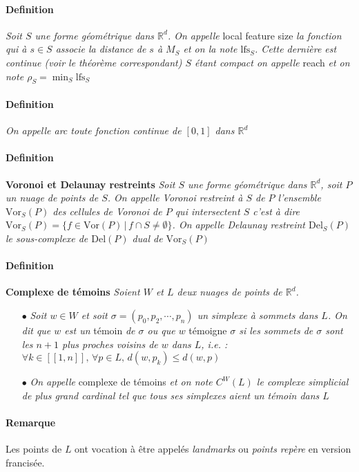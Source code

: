 \documentclass{report}
\newcommand{\R}{\mathbb{R}}
\newcommand{\Vor}{\mathrm{Vor}}
\newcommand{\Del}{\mathrm{Del}}
\begin{document}
\paragraph{Definition} \textit{Soit $S$ une forme géométrique dans $\R^d$. On appelle} local feature size \textit{la fonction qui à $s\in S$ associe la distance de $s$ à $M_S$ et on la note $\mathrm{lfs}_S$. Cette dernière est continue (voir le théorème correspondant) $S$ étant compact on appelle} reach \textit{et on note $\rho_S = \min_S\mathrm{lfs}_S$}
\paragraph{Definition} \textit{On appelle arc toute fonction continue de $[0,1]$ dans $\R^d$}
\paragraph{Definition} \textbf{Voronoi et Delaunay restreints} \textit{Soit $S$ une forme géométrique dans $\R^d$, soit $P$ un nuage de points de $S$. On appelle Voronoi restreint à $S$ de $P$ l'ensemble $\Vor_S(P)$ des cellules de Voronoi de $P$ qui intersectent $S$ c'est à dire $\Vor_S(P) = \{f\in\Vor(P)\,|\,f\cap S\neq\emptyset\}$. On appelle Delaunay restreint $\Del_S(P)$ le sous-complexe de $\Del(P)$ dual de $\Vor_S(P)$}
\paragraph{Definition} \textbf{Complexe de témoins} \textit{Soient $W$ et $L$ deux nuages de points de $\R^d$.}
\begin{itemize}
\item[$\bullet$] \textit{Soit $w\in W$ et soit $\sigma = (p_0, p_2, \cdots, p_n)$ un simplexe à sommets dans $L$. On dit que $w$ est un} témoin \textit{de $\sigma$ ou que $w$} témoigne \textit{$\sigma$ si les sommets de $\sigma$ sont les $n+1$ plus proches voisins de $w$ dans $L$, i.e. : $\forall k\in[\![1,n]\!],\, \forall p\in L,\, d(w, p_k)\leq d(w, p)$}
\item[$\bullet$] \textit{On appelle }complexe de témoins\textit{ et on note $C^W(L)$ le complexe simplicial de plus grand cardinal tel que tous ses simplexes aient un témoin dans $L$}
\end{itemize}
\paragraph{Remarque} Les points de $L$ ont vocation à être appelés \textit{landmarks} ou \textit{points repère} en version francisée.
\end{document}

